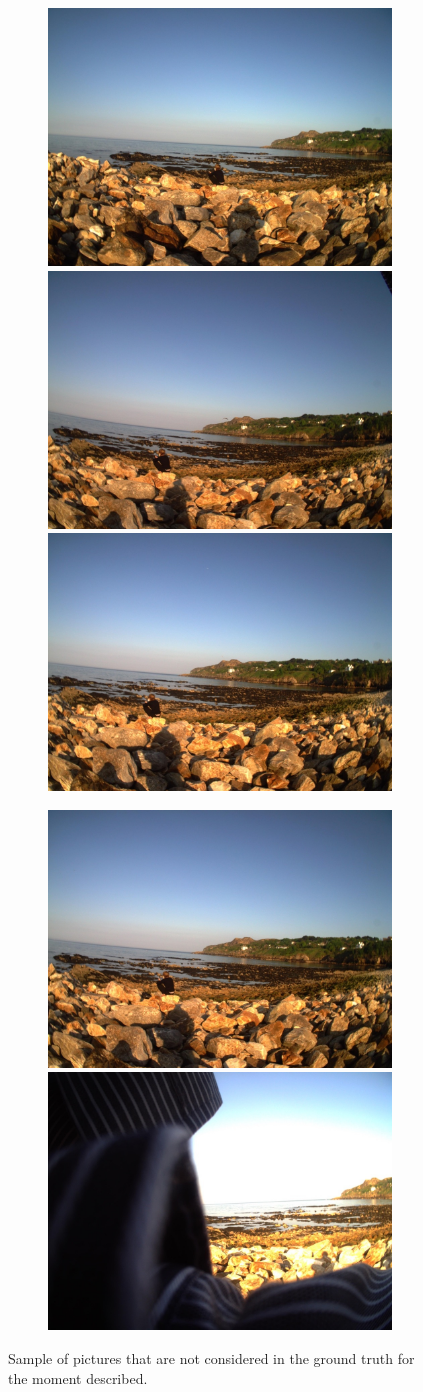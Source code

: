         \begin{figure}[H]
            \centering
            \captionsetup{justification=centering}
            \begin{subfigure}{\linewidth}
            \includegraphics[width=.3\linewidth]{Sections/5ImageClef/images/a.jpg}
            \includegraphics[width=.3\linewidth]{Sections/5ImageClef/images/b.jpg}
            \includegraphics[width=.3\linewidth]{Sections/5ImageClef/images/c.jpg}
            \end{subfigure}\par\medskip
            \begin{subfigure}{\linewidth}
                \hspace{2.2cm}
            \includegraphics[width=.3\linewidth]{Sections/5ImageClef/images/d.jpg}
            \includegraphics[width=.3\linewidth]{Sections/5ImageClef/images/e.jpg}
            \end{subfigure}\par\medskip
            \caption[Pictures outside of the ground truth]{Sample of pictures that are not considered in the ground truth for the moment described.}
            \label{fig:images_notgt}
          \end{figure}
   
